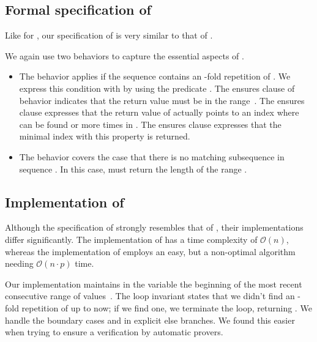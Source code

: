 \subsection{Formal specification of \searchn}

Like for , our specification of 
is very similar to that of .



We again use two behaviors to capture the essential aspects of \searchn.

\begin{itemize}
\item
The behavior  applies if the sequence  
contains an -fold repetition of . 
We express this condition with   by using the predicate
.
The  ensures clause of behavior  indicates
that the return value must be in the range~\inl{[0..n-p]}.
The  ensures clause
expresses that the return value of \searchn actually points to an index 
where 
can be found  or more times in . 
The  ensures clause expresses that the minimal index with
this property is returned.

\item
The behavior  covers the case that there is no matching
subsequence in sequence .
In this case, \searchn must return the length  of the
range .
\end{itemize}



\subsection{Implementation of \searchn}

Although the specification of  strongly resembles that of
, their implementations differ significantly.
The implementation of  has a time complexity of
$\mathcal{O}(n)$, whereas the implementation of
 employs an easy, but
a non-optimal algorithm needing $\mathcal{O}(n \cdot p)$ time.

Our implementation maintains in the variable  the beginning
of the most recent consecutive range of values~.
The loop invariant  states that we didn't find an
-fold repetition of  up to now; if we find one, we
terminate the loop, returning .
%
We handle the boundary cases  and  in explicit else branches.
We found this easier when trying to ensure a verification by automatic provers.

\clearpage

